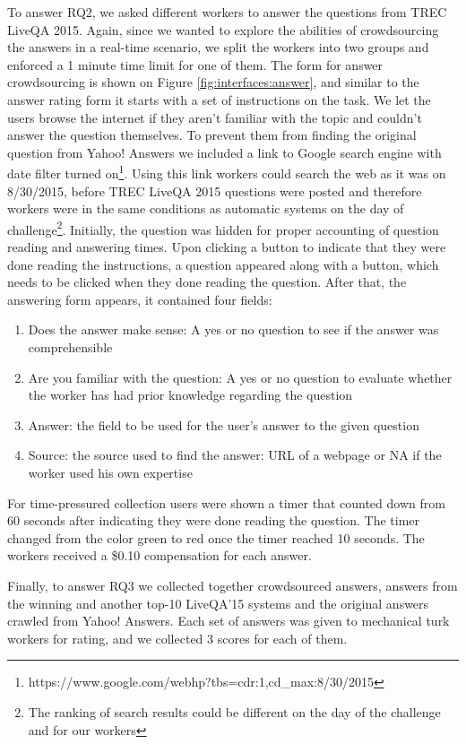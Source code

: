 \documentclass[11pt,letterpaper]{article}
\begin{document}
To answer RQ2, we asked different workers to answer the questions from TREC LiveQA 2015.
Again, since we wanted to explore the abilities of crowdsourcing the answers in a real-time scenario, we split the workers into two groups and enforced a 1 minute time limit for one of them.
The form for answer crowdsourcing is shown on Figure \ref{fig:interfaces:answer}, and similar to the answer rating form it starts with a set of instructions on the task.
We let the users browse the internet if they aren't familiar with the topic and couldn't answer the question themselves.
To prevent them from finding the original question from Yahoo! Answers we included a link to Google search engine with date filter turned on\footnote{https://www.google.com/webhp?tbs=cdr:1,cd\_max:8/30/2015}.
Using this link workers could search the web as it was on 8/30/2015, before TREC LiveQA 2015 questions were posted and therefore workers were in the same conditions as automatic systems on the day of challenge\footnote{The ranking of search results could be different on the day of the challenge and for our workers}.
Initially, the question was hidden for proper accounting of question reading and answering times.
Upon clicking a button to indicate that they were done reading the instructions, a question appeared along with a button, which needs to be clicked when they done reading the question.
After that, the answering form appears, it contained four fields:
\begin{enumerate}
\item Does the answer make sense: A yes or no question to see if the answer was comprehensible 
\item Are you familiar with the question: A yes or no question to evaluate whether the worker has had prior knowledge regarding the question
\item Answer: the field to be used for the user's answer to the given question
\item Source: the source used to find the answer: URL of a webpage or NA if the worker used his own expertise
\end{enumerate}

For time-pressured collection users were shown a timer that counted down from 60 seconds after indicating they were done reading the question.
The timer changed from the color green to red once the timer reached 10 seconds.
The workers received a \$0.10 compensation for each answer.

Finally, to answer RQ3 we collected together crowdsourced answers, answers from the winning and another top-10 LiveQA'15 systems and the original answers crawled from Yahoo! Answers.
Each set of answers was given to mechanical turk workers for rating, and we collected 3 scores for each of them.
\end{document}
